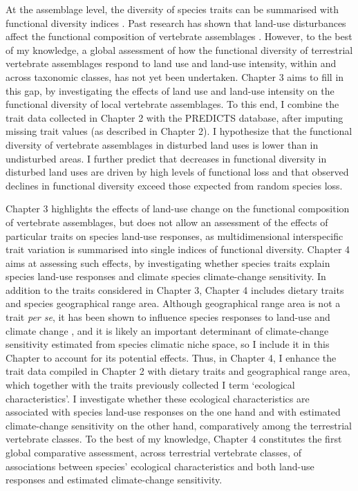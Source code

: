 At the assemblage level, the diversity of species traits can be summarised with functional diversity indices \citep{Villeger2008, Schleuter2010a, Legras2018}. Past research has shown that land-use disturbances affect the functional composition of vertebrate assemblages \citep{Flynn2009, Tinoco2018}. However, to the best of my knowledge, a global assessment of how the functional diversity of terrestrial vertebrate assemblages respond to land use and land-use intensity, within and across taxonomic classes, has not yet been undertaken. Chapter 3 aims to fill in this gap, by investigating the effects of land use and land-use intensity on the functional diversity of local vertebrate assemblages. To this end, I combine the trait data collected in Chapter 2 with the PREDICTS database, after imputing missing trait values (as described in Chapter 2). I hypothesize that the functional diversity of vertebrate assemblages in disturbed land uses is lower than in undisturbed areas. I further predict that decreases in functional diversity in disturbed land uses are driven by high levels of functional loss and that observed declines in functional diversity exceed those expected from random species loss. 

Chapter 3 highlights the effects of land-use change on the functional composition of vertebrate assemblages, but does not allow an assessment of the effects of particular traits on species land-use responses, as multidimensional interspecific trait variation is summarised into single indices of functional diversity. Chapter 4 aims at assessing such effects, by investigating whether species traits explain species land-use responses and climate species climate-change sensitivity. In addition to the traits considered in Chapter 3, Chapter 4 includes dietary traits and species geographical range area. Although geographical range area is not a trait \textit{per se}, it has been shown to influence species responses to land-use and climate change \citep{Thuiller2005, Newbold2018a}, and it is likely an important determinant of climate-change sensitivity estimated from species climatic niche space, so I include it in this Chapter to account for its potential effects. Thus, in Chapter 4, I enhance the trait data compiled in Chapter 2 with dietary traits and geographical range area, which together with the traits previously collected I term `ecological characteristics'. I investigate whether these ecological characteristics are associated with species land-use responses on the one hand and with estimated climate-change sensitivity on the other hand, comparatively among the terrestrial vertebrate classes. To the best of my knowledge, Chapter 4 constitutes the first global comparative assessment, across terrestrial  vertebrate classes, of associations between species’ ecological characteristics and both land-use responses and estimated climate-change sensitivity.

